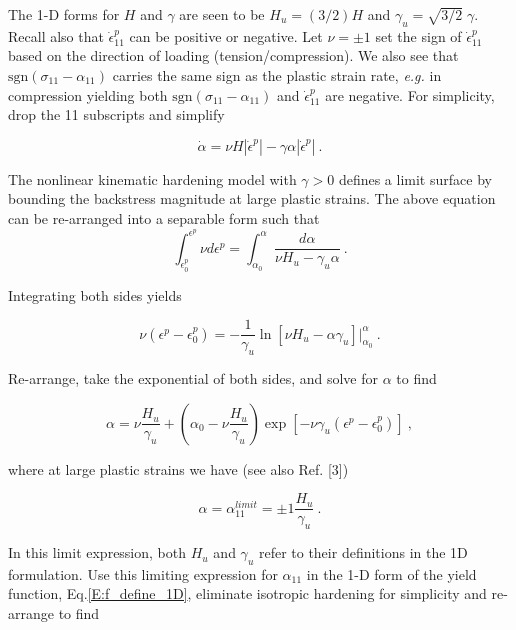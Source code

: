 \documentclass[11pt]{report}
\numberwithin{equation}{section}
\begin{document}
\noindent The 1-D forms for $H$ and $\gamma$ are seen to be
$H_u = (3/2)H$ and $\gamma_u = \sqrt{3/2}\;\gamma$. Recall also that 
$\dot\epsilon^p_{11}$ can be positive or negative. Let $\nu=\pm1$ set the sign of 
$\dot\epsilon^p_{11}$  based on the direction of loading (tension/compression). We also
see that $\text{sgn} \left(\sigma_{11}-\alpha_{11}\right)$ carries the same sign
as the plastic strain rate, \emph{e.g.} in compression yielding both
$\text{sgn} \left(\sigma_{11}-\alpha_{11}\right)$ and $\dot\epsilon^p_{11}$
are negative. For simplicity, drop the 11 subscripts and simplify

\begin{equation}\label{E:define_Hu_gammau1}
\dot\alpha = \nu H |\dot\epsilon^p| - \gamma \alpha |\dot\epsilon^p|~.
\end{equation}


The nonlinear kinematic hardening model with $\gamma >0$ defines a limit
surface by bounding the backstress magnitude at large plastic strains. The above equation can 
be re-arranged into a separable form such that 
\begin{equation}
\int^{\epsilon^p}_{\epsilon^p_0} \nu d\epsilon^p =
\int^{\alpha}_{\alpha_0} 
\frac{d\alpha}
{ \nu H_u   - 
\gamma_u \alpha  }~.
\end{equation}

\noindent Integrating both sides yields

\begin{equation}
\nu \left( \epsilon^p - \epsilon^p_0\right) = 
-\frac{1}{\gamma_u}\ln \left [ \nu H_u - \alpha \gamma_u \right]
 {|}^{\alpha}_{\alpha_0}~.
\end{equation}

\noindent Re-arrange, take the exponential of both sides, 
and solve for $\alpha$ to find

\begin{equation}
\alpha = \nu \frac{H_u}{\gamma_u} + 
\left( \alpha_0 -\nu \frac{H_u}{\gamma_u}\right )
\exp\left[-\nu \gamma_u \left ( \epsilon^p - \epsilon^p_0 \right)\right] ~,
\end{equation}

\noindent where at large plastic strains we have (see also Ref. [3])

\begin{equation}
\alpha = \alpha^{limit}_{11} = \pm1 \frac{H_u}{\gamma_u}~.
\end{equation}

\noindent In this limit expression, both $H_u$ and $\gamma_u$ refer to their definitions in the
1D formulation. Use this limiting expression for $\alpha_{11}$ in the 1-D form of the
yield function, Eq.\;\eqref{E:f_define_1D}, eliminate isotropic hardening for 
simplicity and re-arrange to find
\end{document}
